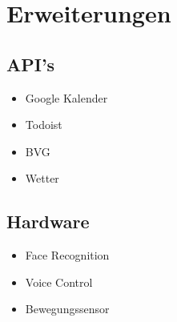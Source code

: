 
\section{Erweiterungen}
\subsection{API's}

\begin{itemize}
\item Google Kalender
\item Todoist
\item BVG
\item Wetter
\end{itemize}
\subsection{Hardware}
\begin{itemize}
\item Face Recognition
\item Voice Control
\item Bewegungssensor
\end{itemize}
